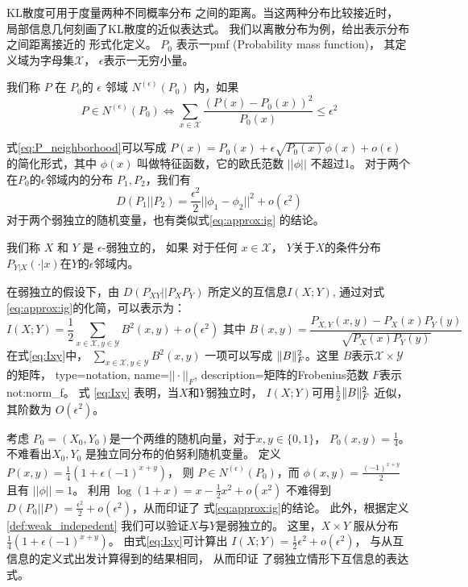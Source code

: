KL散度可用于度量两种不同概率分布
之间的距离。当这两种分布比较接近时，
局部信息几何刻画了KL散度的近似表达式。
我们以离散分布为例，给出表示分布之间距离接近的
形式化定义。
$P_0$ 表示一\gls{pmf} (Probability mass function)，
其定义域为字母集$\mathcal{X}$，
$\epsilon$表示一无穷小量。
\begin{definition}\label{def:eps_neighborhood}
我们称 $P$ 在 $P_0$的 $\epsilon$ 邻域 $N^{(\epsilon)}(P_0)$ 内，如果
\begin{equation}\label{eq:P_neighborhood}
P \in N^{(\epsilon)}(P_0) \iff
\sum_{x \in \mathcal{X}} \frac{(P(x) - P_0(x))^2}{P_0(x)} \leq \epsilon^2
\end{equation}
\end{definition}
式\eqref{eq:P_neighborhood}可以写成 $P(x) = P_0(x) + \epsilon
\sqrt{P_0(x)} \phi(x) + o(\epsilon)$的简化形式，其中 $\phi(x)$
叫做特征函数，它的欧氏范数 $||\phi || $ 不超过1。
对于两个在$P_0$的$\epsilon$邻域内的分布 $P_1, P_2$，我们有
\begin{equation}\label{eq:approx:ig}
D(P_1 || P_2) = \frac{\epsilon^2}{2} ||\phi_1 - \phi_2||^2 + o(\epsilon^2)
\end{equation}
对于两个弱独立的随机变量，也有类似式\eqref{eq:approx:ig}
的结论。
\begin{definition}\label{def:weak_indepedent}
我们称 $X$ 和 $Y$ 是 $\epsilon$-弱独立的，
如果 对于任何 $x \in \mathcal{X}$，
$Y$关于$X$的条件分布
$P_{Y|X}(\cdot |x)$在$Y$的$\epsilon$邻域内。
\end{definition}
在弱独立的假设下，由 $D(P_{XY}||P_XP_Y)$ 所定义的互信息$I(X;Y)$, 
通过对式\eqref{eq:approx:ig}的化简，可以表示为：
\begin{equation}\label{eq:Ixy}
I(X;Y) = \frac{1}{2}\sum_{x\in \mathcal{X}, y\in \mathcal{Y}} B^2(x,y) + o(\epsilon^2)
\textrm{ 其中 }  B(x,y)=\frac{P_{X,Y}(x,y) - P_X(x) P_Y(y)}{\sqrt{P_X(x)P_Y(y)}}
\end{equation}
在式\eqref{eq:Ixy}中， $\sum_{x\in \mathcal{X}, y\in \mathcal{Y}} B^2(x,y)$
一项可以写成 $\lVert B\rVert_F^2$。这里 $B$表示$\mathcal{X} \times \mathcal{Y}$的矩阵，
{
  type=notation,
  name={$||\cdot||_F$},
  description={矩阵的Frobenius范数}
}
$F$表示\glsdesc{not:norm_f}。
式 \eqref{eq:Ixy} 表明，当$X$和$Y$弱独立时，
$I(X;Y)$可用$\frac{1}{2} \lVert B\rVert_F^2$
近似，其阶数为 $O(\epsilon^2)$。

\begin{example}\label{ex:Pweak_1}
考虑 $P_0=(X_0,Y_0)$是一个两维的随机向量，对于$x,y \in \{0,1\}$，
$P_0(x,y)=\frac{1}{4}$。
不难看出$X_0,Y_0$
是独立同分布的伯努利随机变量。
定义 $P(x,y)=\frac{1}{4}(1+\epsilon (-1)^{x+y})$，
则 $P\in N^{(\epsilon)}(P_0)$，而
$\phi(x,y) = \frac{(-1)^{x+y}}{2}$
且有 $||\phi||=1$。
利用 $\log(1+x) = x - \frac{1}{2}x^2 + o(x^2)$
不难得到 $D(P_0||P)=\frac{\epsilon^2}{2}
+o(\epsilon^2)$，从而印证了
式\eqref{eq:approx:ig}的结论。
此外，根据定义 \ref{def:weak_indepedent} 
我们可以验证$X$与$Y$是弱独立的。
这里，$X\times Y$ 服从分布$\frac{1}{4}(1+\epsilon (-1)^{x+y})$。
由式\eqref{eq:Ixy}可计算出
$I(X;Y)=\frac{1}{2}\epsilon^2+o(\epsilon^2)$，
与从互信息的定义式出发计算得到的结果相同，
从而印证
了弱独立情形下互信息的表达式。
\end{example}

